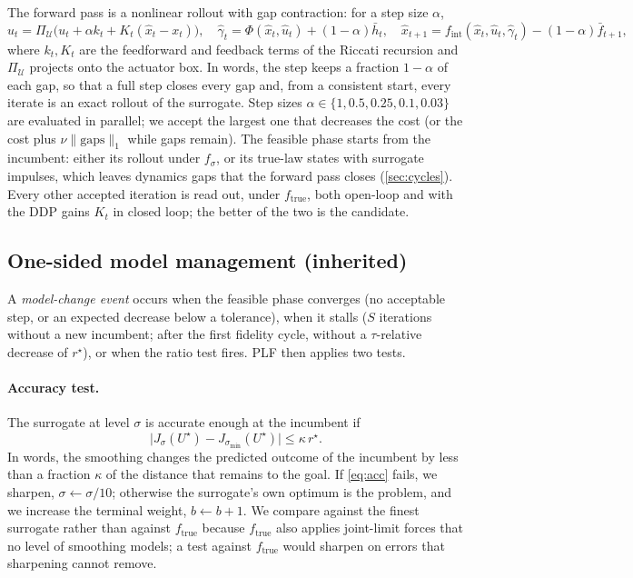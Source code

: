 \documentclass[11pt]{article}
\theoremstyle{remark}
\newcommand{\ftrue}{f_{\mathrm{true}}}
\newcommand{\fint}{f_{\mathrm{int}}}
\newcommand{\smin}{\sigma_{\min}}
\newcommand{\U}{\mathcal{U}}
\newcommand{\inc}{U^\star}
\newcommand{\rinc}{r^\star}
\begin{document}
The forward pass is a nonlinear rollout with gap contraction: for a step size $\alpha$,
\begin{equation}
\label{eq:fwd}
\hat u_t = \Pi_\U\big(u_t + \alpha k_t + K_t(\hat x_t - x_t)\big), \quad \hat\gamma_t = \Phi(\hat x_t, \hat u_t) + (1-\alpha)\bar h_t, \quad \hat x_{t+1} = \fint(\hat x_t, \hat u_t, \hat\gamma_t) - (1-\alpha)\bar f_{t+1},
\end{equation}
where $k_t, K_t$ are the feedforward and feedback terms of the Riccati recursion and $\Pi_\U$ projects onto the actuator box. In words, the step keeps a fraction $1-\alpha$ of each gap, so that a full step closes every gap and, from a consistent start, every iterate is an exact rollout of the surrogate. Step sizes $\alpha \in \{1, 0.5, 0.25, 0.1, 0.03\}$ are evaluated in parallel; we accept the largest one that decreases the cost (or the cost plus $\nu \|\text{gaps}\|_1$ while gaps remain). The feasible phase starts from the incumbent: either its rollout under $f_\sigma$, or its true-law states with surrogate impulses, which leaves dynamics gaps that the forward pass closes (\cref{sec:cycles}). Every other accepted iteration is read out, under $\ftrue$, both open-loop and with the DDP gains $K_t$ in closed loop; the better of the two is the candidate.

\subsection{One-sided model management (inherited)}
\label{sec:oneside}

A \emph{model-change event} occurs when the feasible phase converges (no acceptable step, or an expected decrease below a tolerance), when it stalls ($S$ iterations without a new incumbent; after the first fidelity cycle, without a $\tau$-relative decrease of $\rinc$), or when the ratio test fires. PLF then applies two tests.

\paragraph{Accuracy test.} The surrogate at level $\sigma$ is accurate enough at the incumbent if
\begin{equation}
\label{eq:acc}
\big|J_\sigma(\inc) - J_{\smin}(\inc)\big| \leq \kappa\, \rinc.
\end{equation}
In words, the smoothing changes the predicted outcome of the incumbent by less than a fraction $\kappa$ of the distance that remains to the goal. If \cref{eq:acc} fails, we sharpen, $\sigma \gets \sigma/10$; otherwise the surrogate's own optimum is the problem, and we increase the terminal weight, $b \gets b+1$. We compare against the finest surrogate rather than against $\ftrue$ because $\ftrue$ also applies joint-limit forces that no level of smoothing models; a test against $\ftrue$ would sharpen on errors that sharpening cannot remove.
\end{document}
